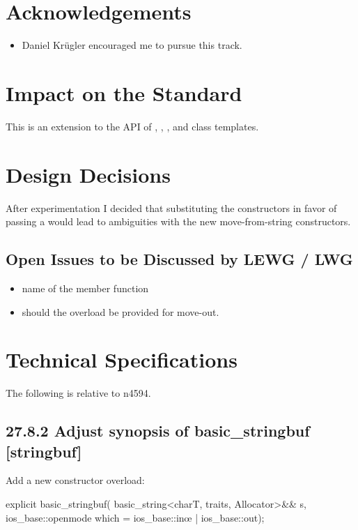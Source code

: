 \documentclass[ebook,11pt,article]{memoir}
\begin{document}
\chapter{Acknowledgements}
\begin{itemize}
\item Daniel Kr\"ugler encouraged me to pursue this track.
\end{itemize}




\chapter{Impact on the Standard}
This is an extension to the API of , , , and  class templates.
\chapter{Design Decisions}
After experimentation I decided that substituting the  constructors in favor of passing a  would lead to ambiguities with the new move-from-string constructors.
\section{Open Issues to be Discussed by LEWG / LWG}
\begin{itemize}
\item name of the  member function
\item should the  overload be provided for move-out.
\end{itemize}

\chapter{Technical Specifications}
The following is relative to n4594.
\section{27.8.2 Adjust synopsis of basic\_stringbuf [stringbuf]}
Add a new constructor overload:
\begin{codeblock}
      explicit basic_stringbuf(
        basic_string<charT, traits, Allocator>&& s,
        ios_base::openmode which = ios_base::inœ | ios_base::out);
\end{codeblock}
\end{document}
